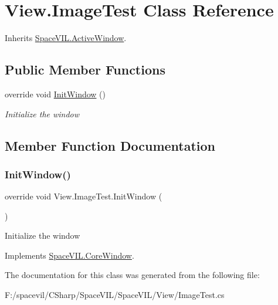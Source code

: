 \hypertarget{class_view_1_1_image_test}{}\section{View.\+Image\+Test Class Reference}
\label{class_view_1_1_image_test}


Inherits \mbox{\hyperlink{class_space_v_i_l_1_1_active_window}{Space\+V\+I\+L.\+Active\+Window}}.

\subsection*{Public Member Functions}
\begin{DoxyCompactItemize}
\item 
override void \mbox{\hyperlink{class_view_1_1_image_test_aa7b380fa57f08a6628ca45aec3d2254e}{Init\+Window}} ()
\begin{DoxyCompactList}\small\item\em Initialize the window \end{DoxyCompactList}\end{DoxyCompactItemize}


\subsection{Member Function Documentation}
\mbox{\label{class_view_1_1_image_test_aa7b380fa57f08a6628ca45aec3d2254e}} 
\subsubsection{\texorpdfstring{Init\+Window()}{InitWindow()}}
{\footnotesize\ttfamily override void View.\+Image\+Test.\+Init\+Window (\begin{DoxyParamCaption}{ }\end{DoxyParamCaption})\hspace{0.3cm}{\ttfamily [virtual]}}



Initialize the window 



Implements \mbox{\hyperlink{class_space_v_i_l_1_1_core_window_aa3cf4ac54d9651b1149584dc81042824}{Space\+V\+I\+L.\+Core\+Window}}.



The documentation for this class was generated from the following file\+:\begin{DoxyCompactItemize}
\item 
F\+:/spacevil/\+C\+Sharp/\+Space\+V\+I\+L/\+Space\+V\+I\+L/\+View/Image\+Test.\+cs\end{DoxyCompactItemize}
